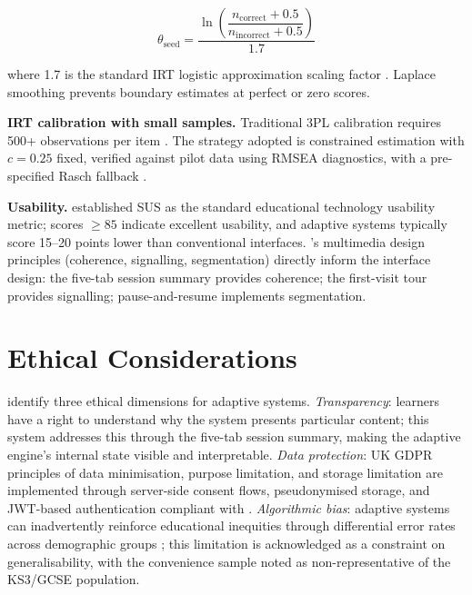 \begin{equation}
  \theta_{\text{seed}} = \frac{\ln\!\left(\dfrac{n_{\text{correct}} + 0.5}{n_{\text{incorrect}} + 0.5}\right)}{1.7}
  \label{eq:theta_seed}
\end{equation}

where 1.7 is the standard IRT logistic approximation scaling factor
\parencite{lord1980}. Laplace smoothing prevents boundary estimates at
perfect or zero scores.

\textbf{IRT calibration with small samples.} Traditional 3PL calibration
requires 500+ observations per item \parencite{lord1980}. The strategy adopted
is constrained estimation with $c = 0.25$ fixed, verified against pilot data
using RMSEA diagnostics, with a pre-specified Rasch fallback \parencite{embretson2000}.

\textbf{Usability.} \textcite{bangor2008} established SUS as the standard
educational technology usability metric; scores $\geq 85$ indicate excellent
usability, and adaptive systems typically score 15--20 points lower than
conventional interfaces. \textcite{mayer2009}'s multimedia design principles
(coherence, signalling, segmentation) directly inform the interface design:
the five-tab session summary provides coherence; the first-visit tour provides
signalling; pause-and-resume implements segmentation.

\section{Ethical Considerations}
\label{sec:lr_ethics}

\textcite{baker2021} identify three ethical dimensions for adaptive systems.
\textit{Transparency}: learners have a right to understand why the system
presents particular content; this system addresses this through the five-tab
session summary, making the adaptive engine's internal state visible and
interpretable. \textit{Data protection}: UK GDPR principles of data
minimisation, purpose limitation, and storage limitation \parencite{voigt2017}
are implemented through server-side consent flows, pseudonymised storage, and
JWT-based authentication compliant with \textcite{nist2017}.
\textit{Algorithmic bias}: adaptive systems can inadvertently reinforce
educational inequities through differential error rates across demographic
groups \parencite{baker2021}; this limitation is acknowledged as a constraint
on generalisability, with the convenience sample noted as non-representative
of the KS3/GCSE population.

